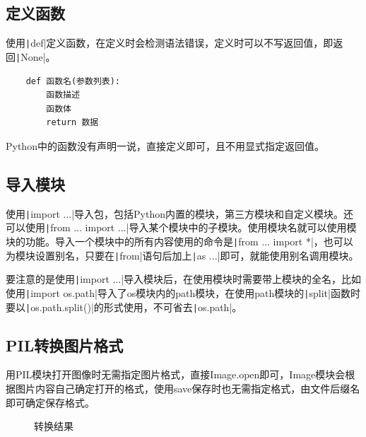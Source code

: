 \documentclass[fontset=ubuntu]{ctexart}
\begin{document}
\subsection{定义函数}
使用\texttt|def|定义函数，在定义时会检测语法错误，定义时可以不写返回值，即返回\texttt|None|。
\begin{listing}[htb]
    \begin{verbatim}
    def 函数名(参数列表):
        函数描述
        函数体
        return 数据
    \end{verbatim}
\end{listing}

Python中的函数没有声明一说，直接定义即可，且不用显式指定返回值。

\subsection{导入模块}
使用\texttt|import ...|导入包，包括Python内置的模块，第三方模块和自定义模块。还可以使用\texttt|from ... import ...|导入某个模块中的子模块。使用模块名就可以使用模块的功能。导入一个模块中的所有内容使用的命令是\texttt|from ... import *|，也可以为模块设置别名，只要在\texttt|from|语句后加上\texttt|as ...|即可，就能使用别名调用模块。

要注意的是使用\texttt|import ...|导入模块后，在使用模块时需要带上模块的全名，比如使用\texttt|import os.path|导入了os模块内的path模块，在使用path模块的\texttt|split|函数时要以\texttt|os.path.split()|的形式使用，不可省去\texttt|os.path|。

\subsection{PIL转换图片格式}
用PIL模块打开图像时无需指定图片格式，直接Image.open即可，Image模块会根据图片内容自己确定打开的格式，使用save保存时也无需指定格式，由文件后缀名即可确定保存格式。
\begin{figure}[htb]
    \centering
    \caption{转换结果}
    \label{convert_2}
\end{figure}
\end{document}
